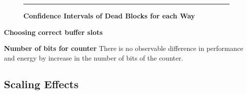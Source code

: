 \begin{figure*} [t]
\centering
 \hrule
 \caption{\label{fig:confi} \scriptsize \bf Confidence Intervals of Dead Blocks for each Way}
\end{figure*}

\noindent\textbf {Choosing correct buffer slots}

\noindent\textbf {Number of bits for counter}
There is no observable difference in performance and energy by increase in the number of bits of the counter. 
\subsection{Scaling Effects}







